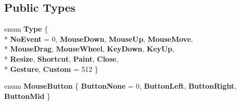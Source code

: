 \subsection*{Public Types}
\begin{DoxyCompactItemize}
\item 
\hypertarget{class_tempest_1_1_event_abaea3e734410b7e9364cf2c75edf60b0}{enum {\bfseries Type} \{ \\*
{\bfseries No\+Event} = 0, 
{\bfseries Mouse\+Down}, 
{\bfseries Mouse\+Up}, 
{\bfseries Mouse\+Move}, 
\\*
{\bfseries Mouse\+Drag}, 
{\bfseries Mouse\+Wheel}, 
{\bfseries Key\+Down}, 
{\bfseries Key\+Up}, 
\\*
{\bfseries Resize}, 
{\bfseries Shortcut}, 
{\bfseries Paint}, 
{\bfseries Close}, 
\\*
{\bfseries Gesture}, 
{\bfseries Custom} = 512
 \}}\label{class_tempest_1_1_event_abaea3e734410b7e9364cf2c75edf60b0}

\item 
\hypertarget{class_tempest_1_1_event_a06f9d48d16768b58b74b1fbf83590aa8}{enum {\bfseries Mouse\+Button} \{ {\bfseries Button\+None} = 0, 
{\bfseries Button\+Left}, 
{\bfseries Button\+Right}, 
{\bfseries Button\+Mid}
 \}}\label{class_tempest_1_1_event_a06f9d48d16768b58b74b1fbf83590aa8}


\end{DoxyCompactItemize}
